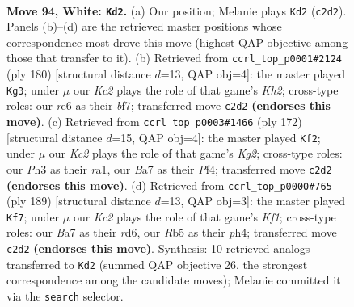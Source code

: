 \documentclass[11pt]{article}
\begin{document}
\clearpage

\begin{figure}[p]\centering
\begin{subfigure}{0.46\textwidth}\centering
\resizebox{\linewidth}{!}{%
\newchessgame
\chessboard[
  setfen={7k/B7/4r3/1R6/4p3/5p1P/2K2P2/8 w - - 13 94},
  showmover=false,
  pgfstyle=straightmove, color=movearrow, markmove={c2-d2}
]}
\caption{}
\end{subfigure}\hfill
\begin{subfigure}{0.46\textwidth}\centering
\resizebox{\linewidth}{!}{%
\newchessgame
\chessboard[
  setfen={3B4/5b2/8/7p/6pP/8/2k4K/8 w - - 62 91},
  showmover=false,
  pgfstyle=straightmove, color=movearrow, markmove={h2-g3}
]}
\caption{}
\end{subfigure}
\\[4pt]
\begin{subfigure}{0.46\textwidth}\centering
\resizebox{\linewidth}{!}{%
\newchessgame
\chessboard[
  setfen={3R4/5pk1/4p3/4P3/5PP1/8/6K1/r7 w - - 89 87},
  showmover=false,
  pgfstyle=straightmove, color=movearrow, markmove={g2-f2}
]}
\caption{}
\end{subfigure}\hfill
\begin{subfigure}{0.46\textwidth}\centering
\resizebox{\linewidth}{!}{%
\newchessgame
\chessboard[
  setfen={5k2/8/3R2p1/4ppP1/7P/2b5/5K2/8 b - - 2 95},
  showmover=false,
  pgfstyle=straightmove, color=movearrow, markmove={f8-f7}
]}
\caption{}
\end{subfigure}
\caption{\textbf{Move 94, White: \texttt{Kd2}.} (a) Our position; Melanie plays \texttt{Kd2} (\texttt{c2d2}). Panels (b)--(d) are the retrieved master positions whose correspondence most drove this move (highest QAP objective among those that transfer to it). (b) Retrieved from \texttt{ccrl\_top\_p0001\#2124} (ply 180) [structural distance $d$=13, QAP obj=4]: the master played \texttt{Kg3}; under $\mu$ our \emph{Kc2} plays the role of that game's \emph{Kh2}; cross-type roles: our \emph{r}e6 as their \emph{b}f7; transferred move \texttt{c2d2} \textbf{(endorses this move)}. (c) Retrieved from \texttt{ccrl\_top\_p0003\#1466} (ply 172) [structural distance $d$=15, QAP obj=4]: the master played \texttt{Kf2}; under $\mu$ our \emph{Kc2} plays the role of that game's \emph{Kg2}; cross-type roles: our \emph{P}h3 as their \emph{r}a1, our \emph{B}a7 as their \emph{P}f4; transferred move \texttt{c2d2} \textbf{(endorses this move)}. (d) Retrieved from \texttt{ccrl\_top\_p0000\#765} (ply 189) [structural distance $d$=13, QAP obj=3]: the master played \texttt{Kf7}; under $\mu$ our \emph{Kc2} plays the role of that game's \emph{Kf1}; cross-type roles: our \emph{B}a7 as their \emph{r}d6, our \emph{R}b5 as their \emph{p}h4; transferred move \texttt{c2d2} \textbf{(endorses this move)}. Synthesis: 10 retrieved analogs transferred to \texttt{Kd2} (summed QAP objective 26, the strongest correspondence among the candidate moves); Melanie committed it via the \texttt{search} selector.}
\label{fig:thought-m186}
\end{figure}
\end{document}
